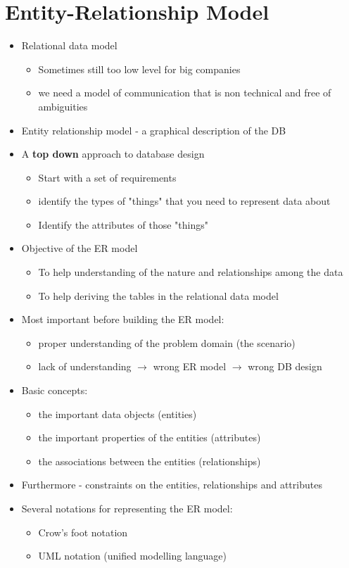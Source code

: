 \documentclass{article}[18pt]
\begin{document}
\section{Entity-Relationship Model}
\begin{itemize}
\item Relational data model
\begin{itemize}
	\item Sometimes still too low level for big companies
	\item we need a model of communication that is non technical and free of ambiguities
\end{itemize}
\item Entity relationship model - a graphical description of the DB
\item A \textbf{top down} approach to database design
\begin{itemize}
	\item Start with a set of requirements
	\item identify the types of "things" that you need to represent data about
	\item Identify the attributes of those "things"
\end{itemize}
\item Objective of the ER model
\begin{itemize}
	\item To help understanding of the nature and relationships among the data
	\item To help deriving the tables in the relational data model
\end{itemize}
\item Most important before building the ER model:
\begin{itemize}
	\item proper understanding of the problem domain (the scenario)
	\item lack of understanding $\rightarrow$ wrong ER model $\rightarrow$ wrong DB design
\end{itemize}
\item Basic concepts:
\begin{itemize}
	\item the important data objects (entities)
	\item the important properties of the entities (attributes)
	\item the associations between the entities (relationships)
\end{itemize}
\item Furthermore - constraints on the entities, relationships and attributes
\item Several notations for representing the ER model:
\begin{itemize}
	\item Crow's foot notation
	\item UML notation (unified modelling language)
\end{itemize}
\end{itemize}
\end{document}

